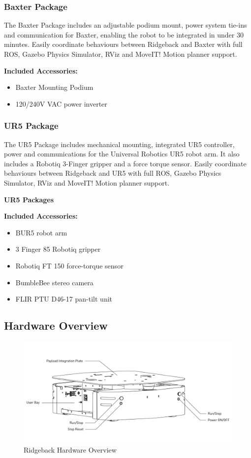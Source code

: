 \documentclass[]{clearpath-latex/clearpath-manual}
\begin{document}
\subsubsection{Baxter Package}

The Baxter Package includes an adjustable podium mount, power system tie-ins and communication for Baxter, enabling the robot to be integrated in under 30 minutes. Easily coordinate behaviours between Ridgeback and Baxter with full ROS, Gazebo Physics Simulator, RViz and MoveIT! Motion planner support.

\textbf{Included Accessories:}
\begin{itemize}[nolistsep]
	\item Baxter Mounting Podium
	\item 120/240V VAC power inverter
\end{itemize}

\subsubsection{UR5 Package}

The UR5 Package includes mechanical mounting, integrated UR5 controller, power and communications for the Universal Robotics UR5 robot arm. It also includes a Robotiq 3-Finger gripper and a force torque sensor. Easily coordinate behaviours between Ridgeback and UR5 with full ROS, Gazebo Physics Simulator, RViz and MoveIT! Motion planner support.

\textbf{UR5 Packages}

\textbf{Included Accessories:}

\begin{itemize}[nolistsep]
	\item BUR5 robot arm
	\item 3 Finger 85 Robotiq gripper
	\item Robotiq FT 150 force-torque sensor
	\item BumbleBee stereo camera
	\item FLIR PTU D46-17 pan-tilt unit
\end{itemize}

\subsection{Hardware Overview}

\begin{figure}[h]
  \centering
  \includegraphics[width=1\linewidth]{Ridgeback_Rear_Drawing_Labeled.pdf}
  \caption{Ridgeback Hardware Overview}
  \label{ridgeback_overview}
\end{figure}
\end{document}
